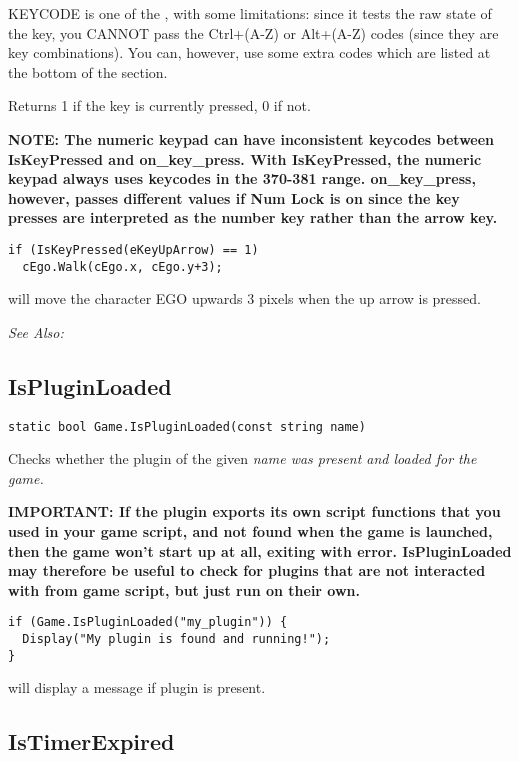 KEYCODE is one of the , with some limitations:
since it tests the raw state of the key, you CANNOT pass the Ctrl+(A-Z)
or Alt+(A-Z) codes (since they are key combinations). You can, however,
use some extra codes which are listed at the bottom of the section.

Returns 1 if the key is currently pressed, 0 if not.

\bf{NOTE:} The numeric keypad can have inconsistent keycodes between IsKeyPressed
and on_key_press. With IsKeyPressed, the numeric keypad always uses keycodes in the 370-381
range. on_key_press, however, passes different values if Num Lock is on since the key
presses are interpreted as the number key rather than the arrow key.

\begin{verbatim}
if (IsKeyPressed(eKeyUpArrow) == 1)
  cEgo.Walk(cEgo.x, cEgo.y+3);
\end{verbatim}
will move the character EGO upwards 3 pixels when the up arrow is pressed.

\it{See Also:} 


\subsection{IsPluginLoaded}\label{IsPluginLoaded}%

\begin{verbatim}
static bool Game.IsPluginLoaded(const string name)
\end{verbatim}
Checks whether the plugin of the given \it{name} was present and loaded for the game.

\bf{IMPORTANT:} If the plugin exports its own script functions that you used in your
game script, and not found when the game is launched, then the game won't start up
at all, exiting with error. IsPluginLoaded may therefore be useful to check for plugins
that are not interacted with from game script, but just run on their own.

\begin{verbatim}
if (Game.IsPluginLoaded("my_plugin")) {
  Display("My plugin is found and running!");
}
\end{verbatim}
will display a message if plugin is present.


\subsection{IsTimerExpired}\label{IsTimerExpired}%

